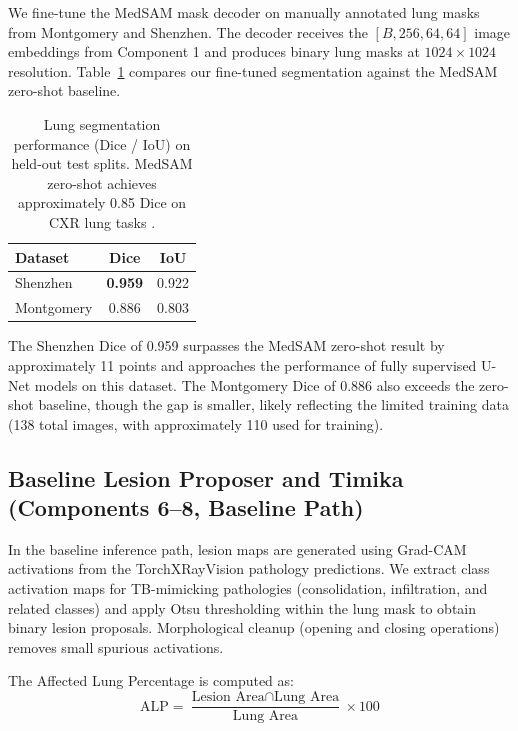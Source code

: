 \documentclass{article}
\begin{document}
We fine-tune the MedSAM mask decoder on manually annotated lung masks from Montgomery and Shenzhen. The decoder receives the $[B, 256, 64, 64]$ image embeddings from Component 1 and produces binary lung masks at $1024 \times 1024$ resolution. Table~\ref{tab:lung_dice} compares our fine-tuned segmentation against the MedSAM zero-shot baseline.

\begin{table}[t]
\caption{Lung segmentation performance (Dice / IoU) on held-out test splits. MedSAM zero-shot achieves approximately 0.85 Dice on CXR lung tasks \cite{ma2024medsam}.}
\label{tab:lung_dice}
\vskip 0.1in
\centering
\begin{tabular}{lcc}
\toprule
Dataset & Dice & IoU \\
\midrule
Shenzhen & \textbf{0.959} & 0.922 \\
Montgomery & 0.886 & 0.803 \\
\bottomrule
\end{tabular}
\end{table}

The Shenzhen Dice of 0.959 surpasses the MedSAM zero-shot result by approximately 11 points and approaches the performance of fully supervised U-Net models on this dataset. The Montgomery Dice of 0.886 also exceeds the zero-shot baseline, though the gap is smaller, likely reflecting the limited training data (138 total images, with approximately 110 used for training).

\subsection{Baseline Lesion Proposer and Timika (Components 6--8, Baseline Path)}

In the baseline inference path, lesion maps are generated using Grad-CAM \cite{selvaraju2017gradcam} activations from the TorchXRayVision pathology predictions. We extract class activation maps for TB-mimicking pathologies (consolidation, infiltration, and related classes) and apply Otsu thresholding \cite{otsu1979threshold} within the lung mask to obtain binary lesion proposals. Morphological cleanup (opening and closing operations) removes small spurious activations.

The Affected Lung Percentage is computed as:
\begin{equation}
\text{ALP} = \frac{\text{Lesion Area} \cap \text{Lung Area}}{\text{Lung Area}} \times 100
\end{equation}
\end{document}
